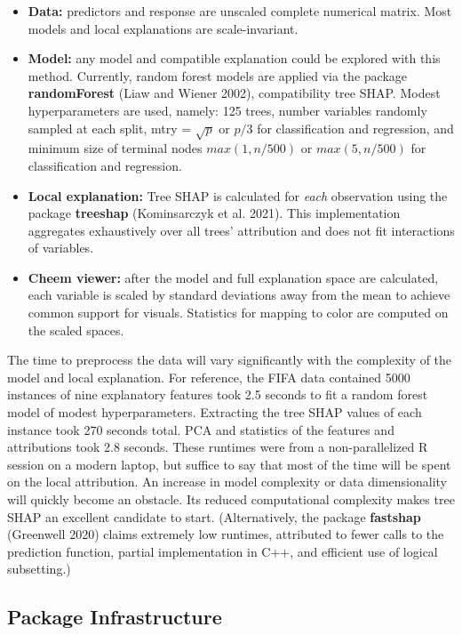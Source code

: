 \documentclass[11pt,twoside]{article}
\providecommand{\tightlist}{%
  \setlength{\itemsep}{0pt}\setlength{\parskip}{0pt}}
\begin{document}
\begin{itemize}
\tightlist
\item
  \textbf{Data:} predictors and response are unscaled complete numerical matrix. Most models and local explanations are scale-invariant.
\item
  \textbf{Model:} any model and compatible explanation could be explored with this method. Currently, random forest models are applied via the package \textbf{randomForest} (Liaw and Wiener 2002), compatibility tree SHAP. Modest hyperparameters are used, namely: 125 trees, number variables randomly sampled at each split, mtry = \(\sqrt{p}\) or \(p/3\) for classification and regression, and minimum size of terminal nodes \(max(1, n/500)\) or \(max(5, n/500)\) for classification and regression.
\item
  \textbf{Local explanation:} Tree SHAP is calculated for \emph{each} observation using the package \textbf{treeshap} (Kominsarczyk et al. 2021). This implementation aggregates exhaustively over all trees' attribution and does not fit interactions of variables.
\item
  \textbf{Cheem viewer:} after the model and full explanation space are calculated, each variable is scaled by standard deviations away from the mean to achieve common support for visuals. Statistics for mapping to color are computed on the scaled spaces.
\end{itemize}

The time to preprocess the data will vary significantly with the complexity of the model and local explanation. For reference, the FIFA data contained 5000 instances of nine explanatory features took 2.5 seconds to fit a random forest model of modest hyperparameters. Extracting the tree SHAP values of each instance took 270 seconds total. PCA and statistics of the features and attributions took 2.8 seconds. These runtimes were from a non-parallelized R session on a modern laptop, but suffice to say that most of the time will be spent on the local attribution. An increase in model complexity or data dimensionality will quickly become an obstacle. Its reduced computational complexity makes tree SHAP an excellent candidate to start. (Alternatively, the package \textbf{fastshap} (Greenwell 2020) claims extremely low runtimes, attributed to fewer calls to the prediction function, partial implementation in C++, and efficient use of logical subsetting.)

\hypertarget{sec:infrastructure}{%
\subsection{Package Infrastructure}\label{sec:infrastructure}}
\end{document}
